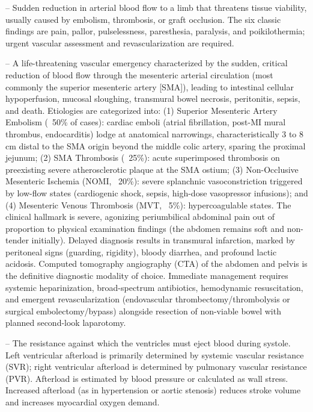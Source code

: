 -- Sudden reduction in arterial blood flow to a limb that threatens tissue viability, usually caused by embolism, thrombosis, or graft occlusion. The six classic findings are pain, pallor, pulselessness, paresthesia, paralysis, and poikilothermia; urgent vascular assessment and revascularization are required.

-- A life-threatening vascular emergency characterized by the sudden, critical reduction of blood flow through the mesenteric arterial circulation (most commonly the superior mesenteric artery [SMA]), leading to intestinal cellular hypoperfusion, mucosal sloughing, transmural bowel necrosis, peritonitis, sepsis, and death. Etiologies are categorized into: (1) Superior Mesenteric Artery Embolism (~50\% of cases): cardiac emboli (atrial fibrillation, post-MI mural thrombus, endocarditis) lodge at anatomical narrowings, characteristically 3 to 8 cm distal to the SMA origin beyond the middle colic artery, sparing the proximal jejunum; (2) SMA Thrombosis (~25\%): acute superimposed thrombosis on preexisting severe atherosclerotic plaque at the SMA ostium; (3) Non-Occlusive Mesenteric Ischemia (NOMI, ~20\%): severe splanchnic vasoconstriction triggered by low-flow states (cardiogenic shock, sepsis, high-dose vasopressor infusions); and (4) Mesenteric Venous Thrombosis (MVT, ~5\%): hypercoagulable states. The clinical hallmark is severe, agonizing periumbilical abdominal pain out of proportion to physical examination findings (the abdomen remains soft and non-tender initially). Delayed diagnosis results in transmural infarction, marked by peritoneal signs (guarding, rigidity), bloody diarrhea, and profound lactic acidosis. Computed tomography angiography (CTA) of the abdomen and pelvis is the definitive diagnostic modality of choice. Immediate management requires systemic heparinization, broad-spectrum antibiotics, hemodynamic resuscitation, and emergent revascularization (endovascular thrombectomy/thrombolysis or surgical embolectomy/bypass) alongside resection of non-viable bowel with planned second-look laparotomy.

-- The resistance against which the ventricles must eject blood during systole. Left ventricular afterload is primarily determined by systemic vascular resistance (SVR); right ventricular afterload is determined by pulmonary vascular resistance (PVR). Afterload is estimated by blood pressure or calculated as wall stress. Increased afterload (as in hypertension or aortic stenosis) reduces stroke volume and increases myocardial oxygen demand.

